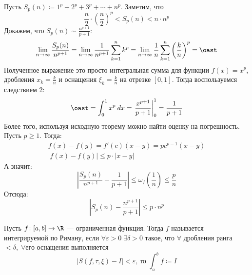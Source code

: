 \begin{example}
  Пусть $S_p(n) \coloneqq 1^p + 2^p + 3^p + \dotsb + n^p$. Заметим, что
  \begin{equation*}
    \frac{n}{2} \cdot \left(\frac{n}{2} \right)^p < S_p(n) < n \cdot n^p
  \end{equation*}
  Докажем, что $S_p(n) \sim \frac{n^{p + 1}}{p + 1}$:
  \begin{equation*}
      \lim\limits_{n \to \infty} \frac{S_p(n)}{n^{p + 1}} =
      \lim\limits_{n \to \infty} \frac{1}{n^{p + 1}}\sum_{k = 1}^{n} k^p =
      \lim\limits_{n \to \infty} \frac{1}{n}\sum_{k = 1}^{n} \left(\frac{k}{n}\right)^p = \oast
  \end{equation*}
  Полученное выражение это просто интегральная сумма для функции $f(x) = x^p$, дробления $x_k = \frac{k}{n}$ и оснащения $\xi_k = \frac{k}{n}$ на отрезке $[0, 1]$. Тогда воспользуемся следствием 2:
  \begin{equation*}
      \oast = \int_{0}^{1} x^p \: dx = \left. \frac{x^{p + 1}}{p + 1} \right|_{0}^{1} = \frac{1}{p + 1}
  \end{equation*}
  Более того, используя исходную теорему можно найти оценку на погрешность. Пусть $p \geq 1$. Тогда:
  \begin{equation*}
    \begin{gathered}
      f(x) - f(y) = f'(c)(x - y) = pc^{p - 1}(x - y) \\
      | f(x) - f(y) | \leq p \cdot |x - y|
    \end{gathered}
  \end{equation*}
  А значит:
  \begin{equation*}
    \left |
      \frac{S_p(n)}{n^{p + 1}} - \frac{1}{p + 1}
    \right |
    \leq \omega_f\left(\frac{1}{n}\right) \leq \frac{p}{n}
  \end{equation*}
  Отсюда:
  \begin{equation*}
    \left |
      S_p(n) -
      \frac{n^{p + 1}}{p + 1}
    \right |
    \leq p \cdot n^p
  \end{equation*}
\end{example}

\begin{conj}
    Пусть $f\colon [a, b] \to \R$ --- ограниченная функция.
    Тогда $f$ называется интегрируемой по Риману, если $\forall \varepsilon > 0 \; \exists \delta > 0$ такое, что $\forall$ дробления ранга $< \delta,\; \forall$его оснащения выполняется
    \begin{equation*}
        | S(f, \tau, \xi) - I| < \varepsilon\text{, то } \int_{a}^{b} f \coloneqq I
    \end{equation*}
\end{conj}

